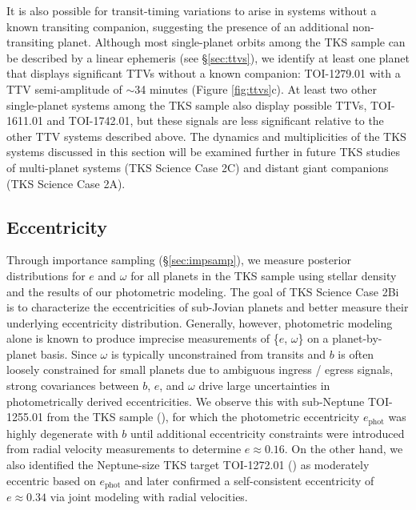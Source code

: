 \documentclass[twocolumn]{aastex63}
\begin{document}
It is also possible for transit-timing variations to arise in systems without a known transiting companion, suggesting the presence of an additional non-transiting planet. Although most single-planet orbits among the TKS sample can be described by a linear ephemeris (see \S\ref{sec:ttvs}), we identify at least one planet that displays significant TTVs without a known companion: TOI-1279.01 with a TTV semi-amplitude of $\sim$34 minutes (Figure \ref{fig:ttvs}c). At least two other single-planet systems among the TKS sample also display possible TTVs, TOI-1611.01 and TOI-1742.01, but these signals are less significant relative to the other TTV systems described above. The dynamics and multiplicities of the TKS systems discussed in this section will be examined further in future TKS studies of multi-planet systems (TKS Science Case 2C) and distant giant companions (TKS Science Case 2A).


\subsection{Eccentricity}
\label{sec:ecc}

Through importance sampling (\S\ref{sec:impsamp}), we measure posterior distributions for $e$ and $\omega$ for all planets in the TKS sample using stellar density and the results of our photometric modeling. The goal of TKS Science Case 2Bi is to characterize the eccentricities of sub-Jovian planets and better measure their underlying eccentricity distribution. Generally, however, photometric modeling alone is known to produce imprecise measurements of \{$e$, $\omega$\} on a planet-by-planet basis. Since $\omega$ is typically unconstrained from transits and $b$ is often loosely constrained for small planets due to ambiguous ingress / egress signals, strong covariances between $b$, $e$, and $\omega$ drive large uncertainties in photometrically derived eccentricities. We observe this with sub-Neptune TOI-1255.01 from the TKS sample (\citealt{MacDougall21}), for which the photometric eccentricity $e_\textrm{phot}$ was highly degenerate with $b$ until additional eccentricity constraints were introduced from radial velocity measurements to determine $e \approx 0.16$. On the other hand, we also identified the Neptune-size TKS target TOI-1272.01 (\citealt{MacDougall22}) as moderately eccentric based on $e_\textrm{phot}$ and later confirmed a self-consistent eccentricity of $e \approx 0.34$ via joint modeling with radial velocities. 
\end{document}
